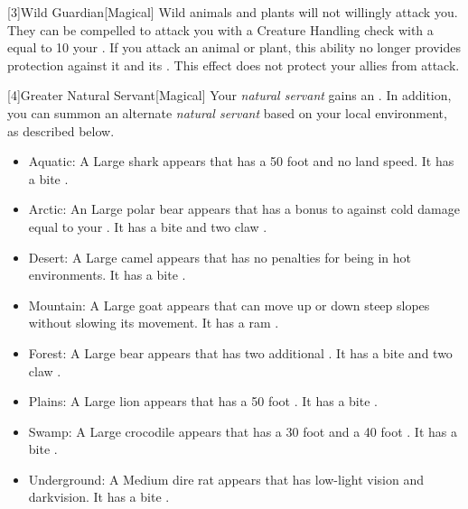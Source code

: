         [3]{Wild Guardian}[Magical] Wild animals and plants will not willingly attack you.
        They can be compelled to attack you with a Creature Handling check with a  equal to 10 \add your .
        If you attack an animal or plant, this ability no longer provides protection against it and its .
        This effect does not protect your allies from attack.

        [4]{Greater Natural Servant}[Magical] Your \textit{natural servant} gains an .
        In addition, you can summon an alternate \textit{natural servant} based on your local environment, as described below.
        \begin{itemize}
            \item Aquatic: A Large shark appears that has a 50 foot  and no land speed.
                It has a bite .
            \item Arctic: An Large polar bear appears that has a bonus to  against cold damage equal to your .
                It has a bite  and two claw .
            \item Desert: A Large camel appears that has no penalties for being in hot environments.
                It has a bite .
            \item Mountain: A Large goat appears that can move up or down steep slopes without slowing its movement.
                It has a ram .
            \item Forest: A Large bear appears that has two additional .
                It has a bite  and two claw .
            \item Plains: A Large lion appears that has a 50 foot .
                It has a bite .
            \item Swamp: A Large crocodile appears that has a 30 foot  and a 40 foot .
                It has a bite .
            \item Underground: A Medium dire rat appears that has low-light vision and darkvision.
                It has a bite .
        \end{itemize}

